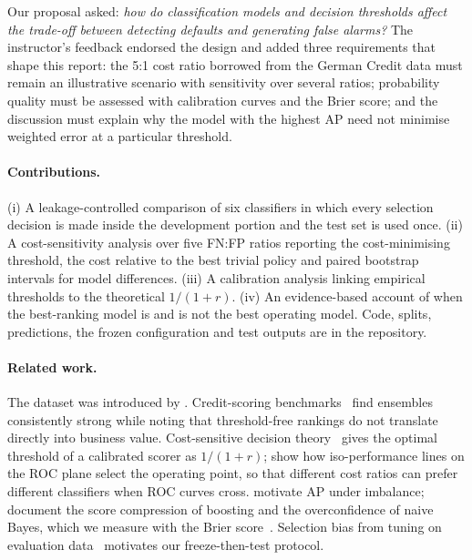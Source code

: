 \documentclass{article}
\begin{document}
Our proposal asked: \emph{how do classification models and decision thresholds affect the trade-off between detecting defaults and generating false alarms?} The instructor's feedback endorsed the design and added three requirements that shape this report: the 5:1 cost ratio borrowed from the German Credit data must remain an illustrative scenario with sensitivity over several ratios; probability quality must be assessed with calibration curves and the Brier score; and the discussion must explain why the model with the highest AP need not minimise weighted error at a particular threshold.

\paragraph{Contributions.} (i) A leakage-controlled comparison of six classifiers in which every selection decision is made inside the development portion and the test set is used once. (ii) A cost-sensitivity analysis over five FN:FP ratios reporting the cost-minimising threshold, the cost relative to the best trivial policy and paired bootstrap intervals for model differences. (iii) A calibration analysis linking empirical thresholds to the theoretical $1/(1+r)$. (iv) An evidence-based account of when the best-ranking model is and is not the best operating model. Code, splits, predictions, the frozen configuration and test outputs are in the repository.

\paragraph{Related work.} The dataset was introduced by \citet{yeh2009comparisons}. Credit-scoring benchmarks~\citep{lessmann2015benchmarking} find ensembles consistently strong while noting that threshold-free rankings do not translate directly into business value. Cost-sensitive decision theory~\citep{elkan2001foundations} gives the optimal threshold of a calibrated scorer as $1/(1+r)$; \citet{provost2001robust} show how iso-performance lines on the ROC plane select the operating point, so that different cost ratios can prefer different classifiers when ROC curves cross. \citet{davis2006relationship} motivate AP under imbalance; \citet{niculescu2005predicting} document the score compression of boosting and the overconfidence of naive Bayes, which we measure with the Brier score~\citep{brier1950verification}. Selection bias from tuning on evaluation data~\citep{cawley2010overfitting} motivates our freeze-then-test protocol.
\end{document}

